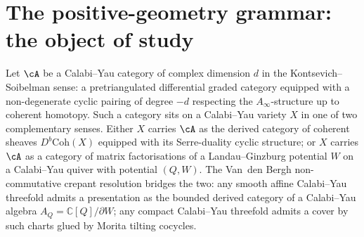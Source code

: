 
\providecommand{\ClaimStatusTheorem}{\textsc{[Theorem]}}
\providecommand{\ClaimStatusConjectured}{\textsc{[Conjectured]}}
\providecommand{\ClaimStatusDefinition}{\textsc{[Definition]}}
\providecommand{\kBKM}{\kappa_{\mathrm{BKM}}}
\providecommand{\kch}{\kappa_{\mathrm{ch}}}
\providecommand{\kcat}{\kappa_{\mathrm{cat}}}
\providecommand{\kfib}{\kappa_{\mathrm{fiber}}}
\providecommand{\CYcat}{\mathrm{CY}\text{-cat}}
\providecommand{\ChirAlg}{\mathrm{ChirAlg}}
\providecommand{\HolFA}{\mathrm{HolFA}}
\providecommand{\hCS}{\mathrm{hCS}}
\providecommand{\Sp}{\mathrm{Sp}}
\providecommand{\cF}{\mathcal{F}}
\providecommand{\cE}{\mathcal{E}}
\providecommand{\cO}{\mathcal{O}}
\providecommand{\cM}{\mathcal{M}}
\providecommand{\fg}{\mathfrak{g}}
\providecommand{\CoHA}{\mathrm{CoHA}}
\providecommand{\Meff}{\mathcal{M}^{+}_{\mathrm{eff}}}
\providecommand{\ZZ}{\mathbb{Z}}
\providecommand{\CC}{\mathbb{C}}
\providecommand{\bH}{\mathbf{H}}


\section{The positive-geometry grammar: the object of study}
\label{wn:sec:platonic-intro-object-wn}

Let $\cA$ be a Calabi--Yau category of complex dimension $d$ in the
Kontsevich--Soibelman sense: a pretriangulated differential graded
category equipped with a non-degenerate cyclic pairing of degree $-d$
respecting the $A_\infty$-structure up to coherent homotopy. Such
a category sits on a Calabi--Yau variety $X$ in one of two
complementary senses. Either $X$ carries $\cA$ as the derived category
of coherent sheaves $D^b \mathrm{Coh}(X)$ equipped with its Serre-duality
cyclic structure; or $X$ carries $\cA$ as a category of
matrix factorisations of a Landau--Ginzburg potential $W$ on a
Calabi--Yau quiver with potential $(Q, W)$. The Van~den Bergh
non-commutative crepant resolution bridges the two: any smooth
affine Calabi--Yau threefold admits a presentation as the bounded
derived category of a Calabi--Yau algebra $A_Q = \mathbb{C}[Q] /
\partial W$; any compact Calabi--Yau threefold admits a cover by
such charts glued by Morita tilting cocycles.

